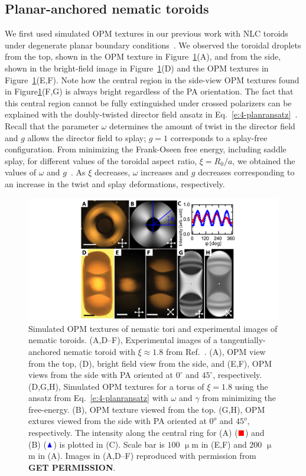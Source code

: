 \subsection{Planar-anchored nematic toroids}
We first used simulated OPM textures in our previous work with NLC toroids under degenerate planar boundary conditions~\cite{RN46}.
We observed the toroidal droplets from the top, shown in the OPM texture in Figure~\ref{f:4-PlanarTorusComparison}(A), and from the side, shown in the bright-field image in Figure~\ref{f:4-PlanarTorusComparison}(D) and the OPM textures in Figure~\ref{f:4-PlanarTorusComparison}(E,F).
Note how the central region in the side-view OPM textures found in Figure\ref{f:4-PlanarTorusComparison}(F,G) is always bright regardless of the PA orientation.
The fact that this central region cannot be fully extinguished under crossed polarizers can be explained with the doubly-twisted director field ansatz in Eq.~\ref{e:4-planransatz}~\cite{RN46}.
Recall that the parameter $\omega$ determines the amount of twist in the director field and $g$ allows the director field to splay; $g=1$ corresponds to a splay-free configuration.
From minimizing the Frank-Oseen free energy, including saddle splay, for different values of the toroidal aspect ratio, $\xi = R_0/a$, we obtained the values of $\omega$ and $g$~\cite{RN46}.
As $\xi$ decreases, $\omega$ increases and $g$ decreases corresponding to an increase in the twist and splay deformations, respectively.
\begin{figure}
\centering
\includegraphics{figures/C4/Ch4-Figs_PlanarToroids.png}
\caption{Simulated OPM textures of nematic tori and experimental images of nematic toroids. (A,D--F), Experimental images of a tangentially-anchored nematic toroid with $\xi \approx 1.8$ from Ref.~\cite{RN46}.
(A), OPM view from the top, (D), bright field view from the side, and (E,F), OPM views from the side with PA oriented at $0^{\circ}$ and $45^{\circ}$, respectively.
(D,G,H), Simulated OPM textures for a torus of $\xi = 1.8$ using the ansatz from Eq.~\ref{e:4-planransatz} with $\omega$ and $\gamma$ from minimizing the free-energy.
(B), OPM texture viewed from the top.
(G,H), OPM extures viewed from the side with PA oriented at $0^o$ and $45^o$, respectively.
The intensity along the central ring for (A) ($\color{red}\blacksquare$) and (B) ($\color{blue}\blacktriangle$) is plotted in (C).
Scale bar is $100$ $\upmu$m in (E,F) and $200$ $\upmu$m in (A).
Images in (A,D--F) reproduced with permission from {\bf GET PERMISSION}.}\label{f:4-PlanarTorusComparison}
\end{figure}


